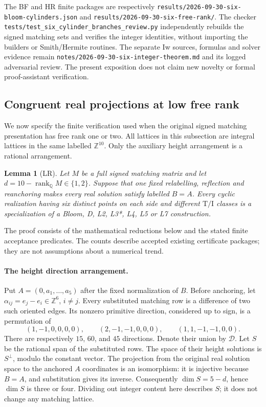 \documentclass[11pt]{article}
\newtheorem{lemma}[theorem]{Lemma}
\theoremstyle{remark}
\newcommand{\Z}{\mathbb Z}
\newcommand{\TI}{\mathrm{T/I}}
\newcommand{\rank}{\operatorname{rank}}
\newcommand{\code}[1]{\nolinkurl{#1}}
\begin{document}
The BF and HR finite packages are respectively
\code{results/2026-09-30-six-bloom-cylinders.json} and
\code{results/2026-09-30-six-free-rank/}. The checker
\code{tests/test_six_cylinder_branches_review.py} independently rebuilds
the signed matching sets and verifies the integer identities, without
importing the builders or Smith/Hermite routines. The separate Iw sources,
formulas and solver evidence remain
\code{notes/2026-09-30-six-integer-theorem.md} and its logged adversarial
review. The present exposition does not claim new novelty or formal
proof-assistant verification.

\subsection{Congruent real projections at low free rank}
\label{sec:lr-expanded}

We now specify the finite verification used when the original signed
matching presentation has free rank one or two. All lattices in this
subsection are integral lattices in the same labelled $\Z^{10}$.
Only the auxiliary height arrangement is a rational arrangement.

\begin{lemma}[LR]\label{lem:lr}
Let $M$ be a full signed matching matrix and let
$d=10-\rank_{\mathbb Q}M\in\{1,2\}$. Suppose that one fixed relabelling,
reflection and reanchoring makes every real solution satisfy labelled
$B=A$. Every cyclic realization having six distinct points on each side
and different $\TI$ classes is a specialization of a Bloom, D, L2,
L3*, L4, L5 or L7 construction.
\end{lemma}

The proof consists of the mathematical reductions below and the stated
finite acceptance predicates. The counts describe accepted existing
certificate packages; they are not assumptions about a numerical trend.

\paragraph{The height direction arrangement.}
Put $A=(0,a_1,\ldots,a_5)$ after the fixed normalization of $B$.
Before anchoring, let $\alpha_{ij}=e_j-e_i\in\Z^6$, $i\ne j$.
Every substituted matching row is a difference of two such oriented
edges. Its nonzero primitive direction, considered up to sign, is a
permutation of
\[
 (1,-1,0,0,0,0),\qquad (2,-1,-1,0,0,0),\qquad
 (1,1,-1,-1,0,0).
\]
There are respectively $15$, $60$, and $45$ directions. Denote their
union by $\mathcal D$. Let $S$ be the rational span of the substituted
rows. The space of their height solutions is $S^\perp$, modulo the
constant vector. The projection from the original real solution space
to the anchored $A$ coordinates is an isomorphism: it is injective
because $B=A$, and substitution gives its inverse. Consequently
$\dim S=5-d$, hence $\dim S$ is three or four. Dividing out integer
content here describes $S$; it does not change any matching lattice.
\end{document}
